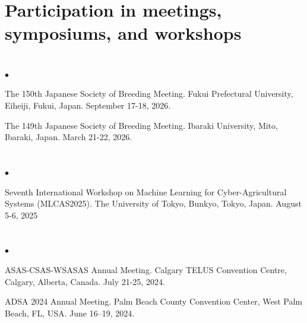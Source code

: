 \documentclass[margin,line,10pt]{res}
\newenvironment{list2}{
  \begin{list}{$\bullet$}{%
      \setlength{\itemsep}{0in}
      \setlength{\parsep}{0in} \setlength{\parskip}{0in}
      \setlength{\topsep}{0in} \setlength{\partopsep}{0in} 
      \setlength{\leftmargin}{0.2in}}}{\end{list}}
\begin{document}
\begin{resume}
\vspace{0.5cm}
\section{\sc Participation in meetings, symposiums, and workshops} 
\vspace{2cm}



\section{}
\begin{list2}

  

  \item The 150th Japanese Society of Breeding Meeting. Fukui Prefectural University, Eiheiji, Fukui, Japan. September 17-18, 2026. 

  \vspace{0.5cm}

  \item The 149th Japanese Society of Breeding Meeting. Ibaraki University, Mito, Ibaraki, Japan. March 21-22, 2026. 

\end{list2}


\section{}
\begin{list2}

  \item Seventh International Workshop on Machine Learning for Cyber-Agricultural Systems (MLCAS2025). The University of Tokyo, Bunkyo, Tokyo, Japan. August 5-6, 2025

\end{list2}


\section{}
\begin{list2}

  \item ASAS-CSAS-WSASAS Annual Meeting. Calgary TELUS Convention Centre, Calgary, Alberta, Canada. July 21-25, 2024.

  \vspace{0.5cm}

  \item  ADSA 2024 Annual Meeting. Palm Beach County Convention Center, West Palm Beach, FL, USA. June 16–19, 2024. 


\end{list2}
\end{resume}
\end{document}

